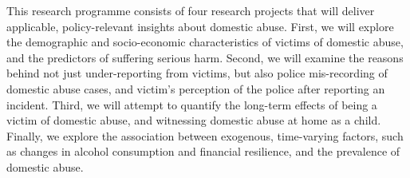 \documentclass[11pt, a4paper]{article}
\begin{document}



This research programme consists of four research projects that will deliver applicable, policy-relevant insights about domestic abuse. First, we will explore the demographic and socio-economic characteristics of victims of domestic abuse, and the predictors of suffering serious harm. Second, we will examine the reasons behind not just under-reporting from victims, but also police mis-recording of domestic abuse cases, and victim's perception of the police after reporting an incident. Third, we will attempt to quantify the long-term effects of being a victim of domestic abuse, and witnessing domestic abuse at home as a child. Finally, we explore the association between exogenous, time-varying factors, such as changes in alcohol consumption and financial resilience, and the prevalence of domestic abuse.
\end{document}
